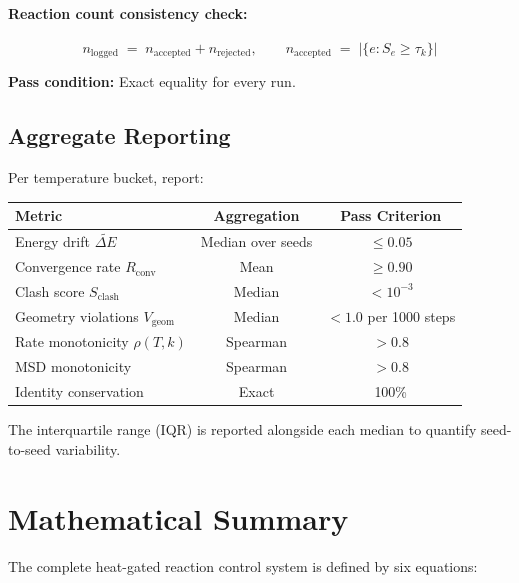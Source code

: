 \documentclass[11pt]{article}
\begin{document}
\paragraph{Reaction count consistency check:}
\begin{equation}
n_{\mathrm{logged}} \;=\; n_{\mathrm{accepted}} + n_{\mathrm{rejected}},
\qquad
n_{\mathrm{accepted}} \;=\; |\{e : S_e \ge \tau_k\}|
\end{equation}

\textbf{Pass condition:} Exact equality for every run.

\subsection{Aggregate Reporting}

Per temperature bucket, report:

\begin{center}
\begin{tabular}{lcc}
\toprule
Metric & Aggregation & Pass Criterion \\
\midrule
Energy drift $\widetilde{\Delta E}$ & Median over seeds & $\le 0.05$ \\
Convergence rate $R_{\mathrm{conv}}$ & Mean & $\ge 0.90$ \\
Clash score $S_{\mathrm{clash}}$ & Median & $< 10^{-3}$ \\
Geometry violations $V_{\mathrm{geom}}$ & Median & $< 1.0$ per 1000 steps \\
Rate monotonicity $\rho(T,k)$ & Spearman & $> 0.8$ \\
MSD monotonicity & Spearman & $> 0.8$ \\
Identity conservation & Exact & 100\% \\
\bottomrule
\end{tabular}
\end{center}

The interquartile range (IQR) is reported alongside each median to
quantify seed-to-seed variability.

\section{Mathematical Summary}

The complete heat-gated reaction control system is defined by six
equations:
\end{document}
